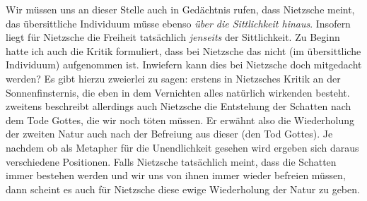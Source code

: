 \documentclass[12pt, a4paper, openany]{report}
\begin{document}
Wir müssen uns an dieser Stelle auch in Gedächtnis rufen, dass Nietzsche meint, das übersittliche Individuum müsse ebenso \emph{über die Sittlichkeit hinaus}. 
Insofern liegt für Nietzsche die Freiheit tatsächlich \emph{jenseits} der Sittlichkeit.
Zu Beginn hatte ich auch die Kritik formuliert, dass bei Nietzsche das  nicht (im übersittliche Individuum) aufgenommen ist.
Inwiefern kann dies bei Nietzsche doch mitgedacht werden? 
Es gibt hierzu zweierlei zu sagen: 
erstens in Nietzsches Kritik an der Sonnenfinsternis, die eben in dem Vernichten alles natürlich wirkenden besteht.
zweitens beschreibt allerdings auch Nietzsche die Entstehung der Schatten nach dem Tode Gottes, die wir noch töten müssen. 
Er erwähnt also die Wiederholung der zweiten Natur auch nach der Befreiung aus dieser (den Tod Gottes).
Je nachdem ob  als Metapher für die Unendlichkeit gesehen wird ergeben sich daraus verschiedene Positionen. 
Falls Nietzsche tatsächlich meint, dass die Schatten immer bestehen werden und wir uns von ihnen immer wieder befreien müssen, dann scheint es auch für Nietzsche diese ewige Wiederholung der Natur zu geben.
\end{document}

